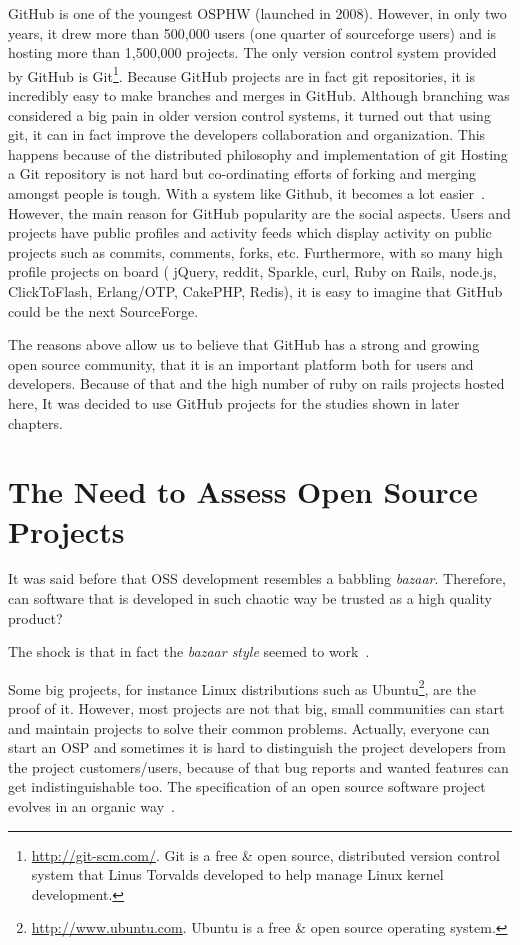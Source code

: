 GitHub is one of the youngest OSPHW (launched in 2008). 
However, in only two years, it drew more than 500,000 users (one quarter of sourceforge users) and is hosting more than 1,500,000 projects. 
The only version control system provided by GitHub is 
Git\footnote{\url{http://git-scm.com/}. 
  Git is a free \& open source, distributed version control system that Linus Torvalds developed to help manage Linux kernel development.
}.
Because GitHub projects are in fact git repositories, 
it is incredibly easy to make branches and merges in GitHub. 
Although branching was considered a big pain in older version control systems, 
it turned out that using git, it can in fact improve the developers collaboration and organization.
This happens because of the distributed philosophy and implementation of git
Hosting a Git repository is not hard but co-ordinating efforts of forking and merging amongst people is tough. 
With a system like Github, it becomes a lot easier~\cite{petercooper2010}.
However, the main reason for GitHub popularity are the social aspects.
Users and projects have public profiles and activity feeds which display activity on public projects such as commits, comments, forks, etc.
Furthermore, with so many high profile projects on board (
jQuery, 
reddit, 
Sparkle, 
curl, 
Ruby on Rails, 
node.js, 
ClickToFlash, 
Erlang/OTP, 
CakePHP, 
Redis), 
it is easy to imagine that GitHub could be the next SourceForge.

The reasons above allow us to believe that GitHub has a strong and growing open source community, 
that it is an important platform both for users and developers. 
Because of that and the high number of ruby on rails projects hosted here,
It was decided to use GitHub projects for the studies shown in later chapters.


\section{The Need to Assess Open Source Projects}

It was said before that OSS development resembles a babbling \textit{bazaar}.
Therefore, can software that is developed in such chaotic way be trusted as a high quality product?

The shock is that in fact the \textit{bazaar style} seemed to work~\cite{halloran2002high}.


Some big projects, for instance Linux distributions such as 
\textsf{Ubuntu}\footnote{\url{http://www.ubuntu.com}. Ubuntu is a free \& open source operating system.},
are the proof of it.
However, most projects are not that big, 
small communities can start and maintain projects to solve their common problems.
Actually, everyone can start an OSP and
sometimes it is hard to distinguish the project developers from the project customers/users,
because of that bug reports and wanted features can get indistinguishable too.
The specification of an open source software project evolves in an organic way~\cite{capiluppicathedral}.

